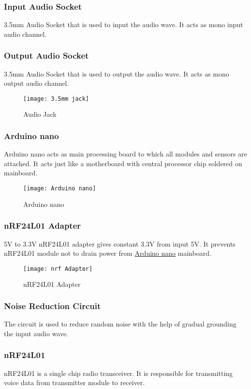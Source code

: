 \subsubsection{Input Audio Socket}
3.5mm Audio Socket that is used to input the audio wave. It acts as mono input audio channel.

\subsubsection{Output Audio Socket}
3.5mm Audio Socket that is used to output the audio wave. It acts as mono output audio channel.

\begin{figure}[h]
  \centering
  \texttt{[image: 3.5mm jack]}
  \caption{Audio Jack}
\end{figure}

\subsubsection{Arduino nano}
Arduino nano acts as main processing board to which all modules and sensors are attached. It acts just like a motherboard with central processor chip soldered on mainboard.

\begin{figure}[h]
  \centering
  \texttt{[image: Arduino nano]}
  \caption{Arduino nano}
\end{figure}

\subsubsection{nRF24L01 Adapter}
5V to 3.3V nRF24L01 adapter gives constant 3.3V from input 5V. It prevents nRF24L01 module not to drain power from \underline{Arduino nano} mainboard.


\begin{figure}[h]
  \centering
  \texttt{[image: nrf Adapter]}
  \caption{nRF24L01 Adapter}
\end{figure}

\subsubsection{Noise Reduction Circuit}
The circuit is used to reduce random noise with the help of gradual grounding the input audio wave.


\subsubsection{nRF24L01}
nRF24L01 is a single chip radio transceiver. It is responsible for transmitting voice data from transmitter module to receiver.


